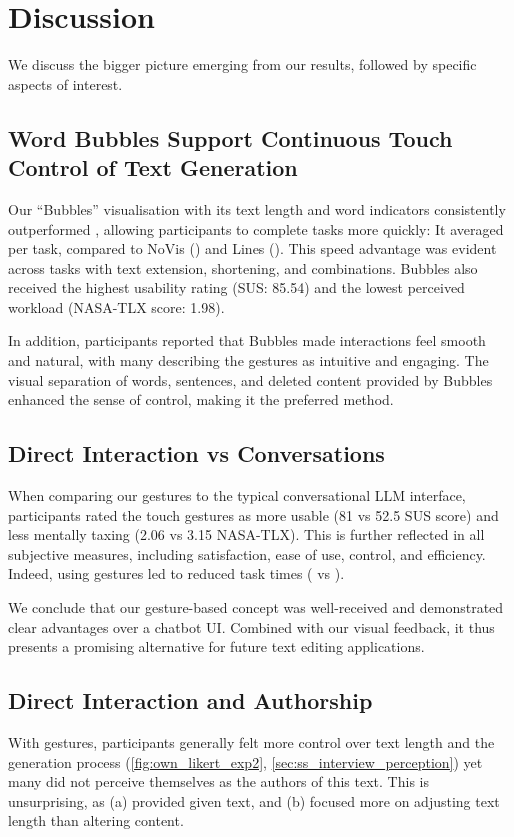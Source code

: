 \section{Discussion}
We discuss the bigger picture emerging from our results, followed by specific aspects of interest.

\subsection{Word Bubbles Support Continuous Touch Control of Text Generation}\label{sec:discussion_bubbles} %
Our ``Bubbles'' visualisation with its text length and word indicators consistently outperformed , allowing participants to complete tasks more quickly: 
It averaged  per task, compared to NoVis () and Lines (). 
This speed advantage was evident across tasks with text extension, shortening, and combinations.
Bubbles also received the highest usability rating (SUS: 85.54) and the lowest perceived workload (NASA-TLX score: 1.98).

In addition, participants reported that Bubbles made interactions feel smooth and natural, with many describing the gestures as intuitive and engaging. 
The visual separation of words, sentences, and deleted content provided by Bubbles enhanced the sense of control, making it the preferred method. %

\subsection{Direct Interaction vs Conversations}
When comparing our gestures to the typical conversational LLM interface, participants rated the touch gestures as more usable (81 vs 52.5 SUS score) and less mentally taxing (2.06 vs 3.15 NASA-TLX). 
This is further reflected in %
all subjective measures, including satisfaction, ease of use, control, and efficiency.
Indeed, using gestures led to  reduced task times ( vs ).

We conclude that our gesture-based concept was well-received and demonstrated clear advantages over a chatbot UI. Combined with our visual feedback, it thus presents a promising alternative for future text editing applications.

\subsection{Direct Interaction and Authorship}
With gestures, participants generally felt more control over text length and the generation process (\cref{fig:own_likert_exp2}, \cref{sec:ss_interview_perception}) yet many did not perceive themselves as the authors of this text. 
This is unsurprising, as  (a) provided given text, and (b) focused more on adjusting text length than altering content.

